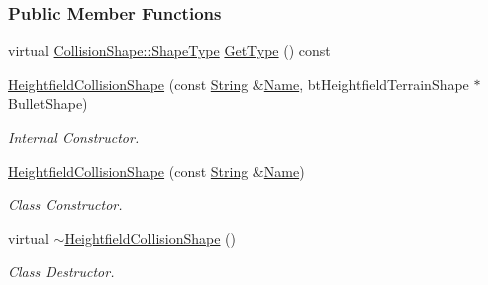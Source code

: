 \subsubsection*{Public Member Functions}
\begin{DoxyCompactItemize}
\item 
virtual \hyperlink{classMezzanine_1_1CollisionShape_ad04186055565998879b64176d6dd100d}{CollisionShape::ShapeType} \hyperlink{classMezzanine_1_1HeightfieldCollisionShape_af27ffaf88fc12af6ddc89704e60ecd33}{GetType} () const 
\item 
\hyperlink{classMezzanine_1_1HeightfieldCollisionShape_a79b5e672a6bded0e2f38587b901247ab}{HeightfieldCollisionShape} (const \hyperlink{namespaceMezzanine_acf9fcc130e6ebf08e3d8491aebcf1c86}{String} \&\hyperlink{classMezzanine_1_1CollisionShape_aac524c5c56fa4d158bc071f8aecfbe79}{Name}, btHeightfieldTerrainShape $\ast$BulletShape)
\begin{DoxyCompactList}\small\item\em Internal Constructor. \item\end{DoxyCompactList}\item 
\hyperlink{classMezzanine_1_1HeightfieldCollisionShape_aee6afa08c9007498cc0693b8bfb2da95}{HeightfieldCollisionShape} (const \hyperlink{namespaceMezzanine_acf9fcc130e6ebf08e3d8491aebcf1c86}{String} \&\hyperlink{classMezzanine_1_1CollisionShape_aac524c5c56fa4d158bc071f8aecfbe79}{Name})
\begin{DoxyCompactList}\small\item\em Class Constructor. \item\end{DoxyCompactList}\item 
\hypertarget{classMezzanine_1_1HeightfieldCollisionShape_ac9521af83a3d96d3f2c71c5a8a39b09d}{
virtual \hyperlink{classMezzanine_1_1HeightfieldCollisionShape_ac9521af83a3d96d3f2c71c5a8a39b09d}{$\sim$HeightfieldCollisionShape} ()}
\label{classMezzanine_1_1HeightfieldCollisionShape_ac9521af83a3d96d3f2c71c5a8a39b09d}

\begin{DoxyCompactList}\small\item\em Class Destructor. \item\end{DoxyCompactList}\end{DoxyCompactItemize}

